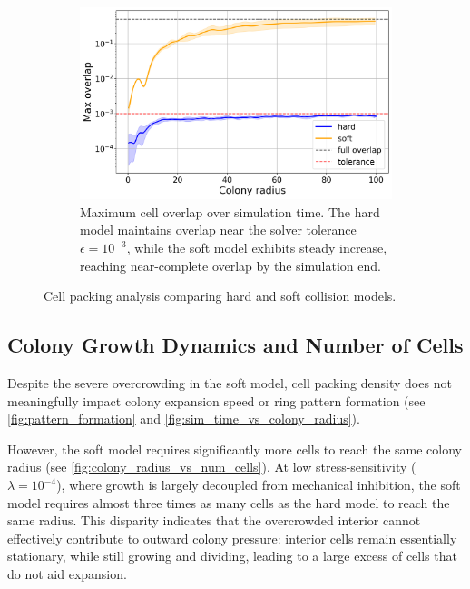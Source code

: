 \documentclass[conference]{IEEEtran}
\begin{document}
\begin{figure}[H]
    \begin{subfigure}[b]{\linewidth}
        \centering
        \includegraphics[width=\linewidth]{figures/comparison_plots/combined_colony_radius_vs_max_overlap_with_lines.png}
        \caption{Maximum cell overlap over simulation time. The hard model maintains overlap near the solver tolerance $\epsilon = 10^{-3}$, while the soft model exhibits steady increase, reaching near-complete overlap by the simulation end.}
        \label{fig:max_overlap_simulation}
    \end{subfigure}

    \caption{Cell packing analysis comparing hard and soft collision models.}
    \label{fig:combined_packing_analysis}
\end{figure}

\subsection{Colony Growth Dynamics and Number of Cells}
\label{sec:colony_growth_dynamics}

Despite the severe overcrowding in the soft model, cell packing density does not meaningfully impact colony expansion speed or ring pattern formation (see \autoref{fig:pattern_formation} and \autoref{fig:sim_time_vs_colony_radius}).

However, the soft model requires significantly more cells to reach the same colony radius (see \autoref{fig:colony_radius_vs_num_cells}). At low stress-sensitivity ($\lambda = 10^{-4}$), where growth is largely decoupled from mechanical inhibition, the soft model requires almost three times as many cells as the hard model to reach the same radius. This disparity indicates that the overcrowded interior cannot effectively contribute to outward colony pressure: interior cells remain essentially stationary, while still growing and dividing, leading to a large excess of cells that do not aid expansion.
\end{document}
